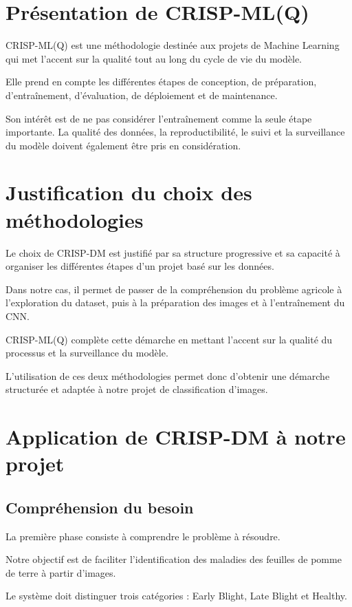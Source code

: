\documentclass[12pt,a4paper,oneside]{report}
\begin{document}
\section{Présentation de CRISP-ML(Q)}

CRISP-ML(Q) est une méthodologie destinée aux projets
de Machine Learning qui met l'accent sur la qualité
tout au long du cycle de vie du modèle.

Elle prend en compte les différentes étapes de conception,
de préparation, d'entraînement, d'évaluation, de déploiement
et de maintenance.

Son intérêt est de ne pas considérer l'entraînement
comme la seule étape importante. La qualité des données,
la reproductibilité, le suivi et la surveillance du modèle
doivent également être pris en considération.

\section{Justification du choix des méthodologies}

Le choix de CRISP-DM est justifié par sa structure
progressive et sa capacité à organiser les différentes
étapes d'un projet basé sur les données.

Dans notre cas, il permet de passer de la compréhension
du problème agricole à l'exploration du dataset, puis
à la préparation des images et à l'entraînement du CNN.

CRISP-ML(Q) complète cette démarche en mettant l'accent
sur la qualité du processus et la surveillance du modèle.

L'utilisation de ces deux méthodologies permet donc
d'obtenir une démarche structurée et adaptée à notre
projet de classification d'images.

\section{Application de CRISP-DM à notre projet}

\subsection{Compréhension du besoin}

La première phase consiste à comprendre le problème
à résoudre.

Notre objectif est de faciliter l'identification des
maladies des feuilles de pomme de terre à partir d'images.

Le système doit distinguer trois catégories :
Early Blight, Late Blight et Healthy.
\end{document}
